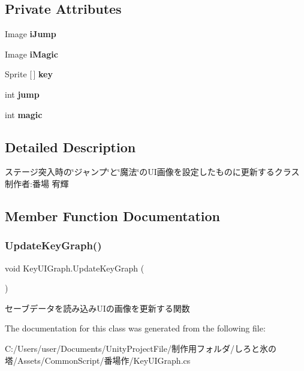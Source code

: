 \subsection*{Private Attributes}
\begin{DoxyCompactItemize}
\item 
\mbox{\label{class_key_u_i_graph_a0d4a14730289fbc1a3448403978eb830}} 
Image {\bfseries i\+Jump}
\item 
\mbox{\label{class_key_u_i_graph_a22e463108e79df31aa959898cd8aea68}} 
Image {\bfseries i\+Magic}
\item 
\mbox{\label{class_key_u_i_graph_ae610cc24463a73e3b6886d2697d604a0}} 
Sprite \mbox{[}$\,$\mbox{]} {\bfseries key}
\item 
\mbox{\label{class_key_u_i_graph_ab5b919adabbfab17e8fece7ded7f45c5}} 
int {\bfseries jump}
\item 
\mbox{\label{class_key_u_i_graph_af9d53e5243ac6e02186f403fea2a4b4d}} 
int {\bfseries magic}
\end{DoxyCompactItemize}


\subsection{Detailed Description}
ステージ突入時の\char`\"{}ジャンプ\char`\"{}と\char`\"{}魔法\char`\"{}の\+U\+I画像を設定したものに更新するクラス 制作者\+:番場 宥輝 



\subsection{Member Function Documentation}
\mbox{\label{class_key_u_i_graph_a1bf3620901c801f83589b5e7bfa8a309}} 
\subsubsection{\texorpdfstring{Update\+Key\+Graph()}{UpdateKeyGraph()}}
{\footnotesize\ttfamily void Key\+U\+I\+Graph.\+Update\+Key\+Graph (\begin{DoxyParamCaption}{ }\end{DoxyParamCaption})\hspace{0.3cm}{\ttfamily [inline]}}



セーブデータを読み込み\+U\+Iの画像を更新する関数 



The documentation for this class was generated from the following file\+:\begin{DoxyCompactItemize}
\item 
C\+:/\+Users/user/\+Documents/\+Unity\+Project\+File/制作用フォルダ/しろと氷の塔/\+Assets/\+Common\+Script/番場作/Key\+U\+I\+Graph.\+cs\end{DoxyCompactItemize}
